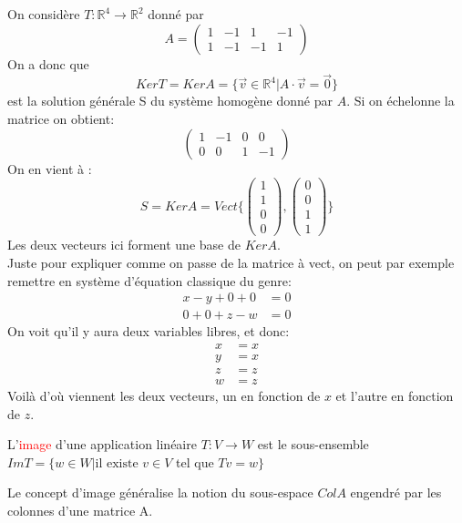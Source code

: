 \begin{exemple}
    On considère $T : \mathbb{R}^4 \to \mathbb{R}^2$ donné par
    \[A = \begin{pmatrix}
        1 & -1 & 1 & -1 \\ 1 & -1 & -1 & 1
    \end{pmatrix}\]
    On a donc que 
    \[Ker T = Ker A = \{\vec{v}\in \mathbb{R}^4| A \cdot \vec{v}= \vec{0}\}\]
    est la solution générale S du système homogène donné par $A$. Si on échelonne la matrice on obtient:
    \[\begin{pmatrix}
        1 & -1 & 0 & 0 \\ 0 & 0 & 1 & -1
    \end{pmatrix}\]
    On en vient à :
    \[S = Ker A = Vect \{ \begin{pmatrix}
        1 \\ 1 \\ 0 \\ 0
    \end{pmatrix}, \begin{pmatrix}
        0 \\ 0 \\ 1 \\ 1
    \end{pmatrix}\}\]
    Les deux vecteurs ici forment une base de $Ker A$.
    \\
    Juste pour expliquer comme on passe de la matrice à vect, on peut par exemple remettre en système d'équation classique du genre:
    \begin{align*}
        x -y + 0 + 0 &= 0\\
        0 + 0 + z - w &= 0
    \end{align*}
    On voit qu'il y aura deux variables libres, et donc:
    \begin{align*}
        x &= x \\
        y &= x\\
        z &= z\\
        w &= z
    \end{align*}
    Voilà d'où viennent les deux vecteurs, un en fonction de $x$ et l'autre en fonction de $z$.
\end{exemple}

\begin{definition}
    L'\textcolor{red}{image} d'une application linéaire $T : V \to W$ est le sous-ensemble $Im T = \{w \in W| \text{il existe } v \in V $ tel que $Tv = w\}$
\end{definition}
\begin{framedremark}
    Le concept d'image généralise la notion du sous-espace $Col A$ engendré par les colonnes d'une matrice A.
\end{framedremark}

